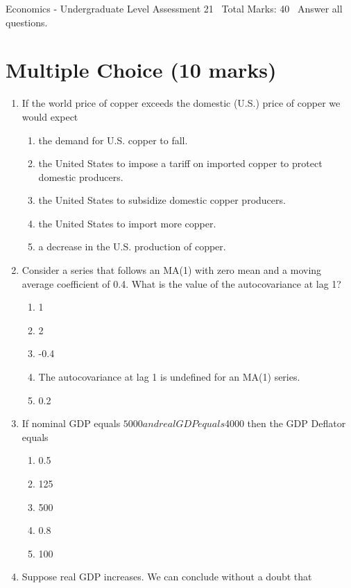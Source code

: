 \documentclass[12pt]{article}
\begin{document}
\begin{center}
Economics - Undergraduate Level Assessment 21 \
Total Marks: 40 \
Answer all questions.
\end{center}

\section*{Multiple Choice (10 marks)}
\begin{enumerate}[label=\arabic*.]
\item If the world price of copper exceeds the domestic (U.S.) price of copper we would expect
\begin{enumerate}[label=(\alph*)]
    \item the demand for U.S. copper to fall.
    \item the United States to impose a tariff on imported copper to protect domestic producers.
    \item the United States to subsidize domestic copper producers.
    \item the United States to import more copper.
    \item a decrease in the U.S. production of copper.
\end{enumerate}
\item Consider a series that follows an MA(1) with zero mean and a moving average coefficient of 0.4. What is the value of the autocovariance at lag 1?
\begin{enumerate}[label=(\alph*)]
    \item 1
    \item 2
    \item -0.4
    \item The autocovariance at lag 1 is undefined for an MA(1) series.
    \item 0.2
\end{enumerate}
\item If nominal GDP equals $5000 and real GDP equals $4000 then the GDP Deflator equals
\begin{enumerate}[label=(\alph*)]
    \item 0.5
    \item 125
    \item 500
    \item 0.8
    \item 100
\end{enumerate}
\item Suppose real GDP increases. We can conclude without a doubt that
\begin{enumerate}[label=(\alph*)]

\end{enumerate}
\end{enumerate}
\end{document}
